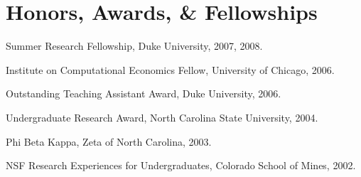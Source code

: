 \documentclass[10pt,letterpaper]{article}
\renewenvironment{itemize}{
  \begin{list}{}{
    \setlength{\leftmargin}{1.5em}
    \setlength{\itemsep}{0.25em}
    \setlength{\parskip}{0pt}
    \setlength{\parsep}{0.25em}
  }
}{
  \end{list}
}
\begin{document}
\section*{Honors, Awards, \& Fellowships}

\begin{itemize}
\item Summer Research Fellowship, Duke University, 2007, 2008.
\item Institute on Computational Economics Fellow, University of Chicago, 2006.
\item Outstanding Teaching Assistant Award, Duke University, 2006.
\item Undergraduate Research Award, North Carolina State University, 2004.
\item Phi Beta Kappa, Zeta of North Carolina, 2003.
\item NSF Research Experiences for Undergraduates, Colorado School of Mines, 2002.
\end{itemize}

\end{document}
